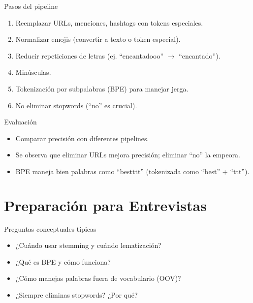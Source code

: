 \documentclass[aspectratio=169, 10pt, xcolor=table]{beamer}
\begin{document}
\begin{frame}{Pasos del pipeline}
    \begin{enumerate}
        \item Reemplazar URLs, menciones, hashtags con tokens especiales.
        \item Normalizar emojis (convertir a texto o token especial).
        \item Reducir repeticiones de letras (ej. ``encantadooo'' $\rightarrow$ ``encantado'').
        \item Minúsculas.
        \item Tokenización por subpalabras (BPE) para manejar jerga.
        \item No eliminar stopwords (``no'' es crucial).
    \end{enumerate}
\end{frame}

\begin{frame}{Evaluación}
    \begin{itemize}
        \item Comparar precisión con diferentes pipelines.
        \item Se observa que eliminar URLs mejora precisión; eliminar ``no'' la empeora.
        \item BPE maneja bien palabras como ``bestttt'' (tokenizada como ``best'' + ``ttt'').
    \end{itemize}
\end{frame}

\section{Preparación para Entrevistas}

\begin{frame}{Preguntas conceptuales típicas}
    \begin{itemize}
        \item ¿Cuándo usar stemming y cuándo lematización?
        \item ¿Qué es BPE y cómo funciona?
        \item ¿Cómo manejas palabras fuera de vocabulario (OOV)?
        \item ¿Siempre eliminas stopwords? ¿Por qué?
    \end{itemize}
\end{frame}
\end{document}
